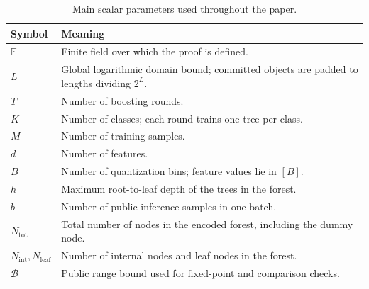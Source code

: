 \begin{table}[t]
    \centering
    \small
    \caption{Main scalar parameters used throughout the paper.}
    \label{tab:main-scalars}
    \begin{tabular}{@{}p{}p{}@{}}
        \toprule
        Symbol & Meaning \\
        \midrule
        $\mathbb{F}$ & Finite field over which the proof is defined. \\
        $L$ & Global logarithmic domain bound; committed objects are padded to lengths dividing $2^L$. \\
        $T$ & Number of boosting rounds. \\
        $K$ & Number of classes; each round trains one tree per class. \\
        $M$ & Number of training samples. \\
        $d$ & Number of features. \\
        $B$ & Number of quantization bins; feature values lie in $[B]$. \\
        $h$ & Maximum root-to-leaf depth of the trees in the forest. \\
        $b$ & Number of public inference samples in one batch. \\
        $N_{\mathrm{tot}}$ & Total number of nodes in the encoded forest, including the dummy node. \\
        $N_{\mathrm{int}},N_{\mathrm{leaf}}$ & Number of internal nodes and leaf nodes in the forest. \\
        $\mathcal{B}$ & Public range bound used for fixed-point and comparison checks. \\
        \bottomrule
    \end{tabular}
\end{table}
